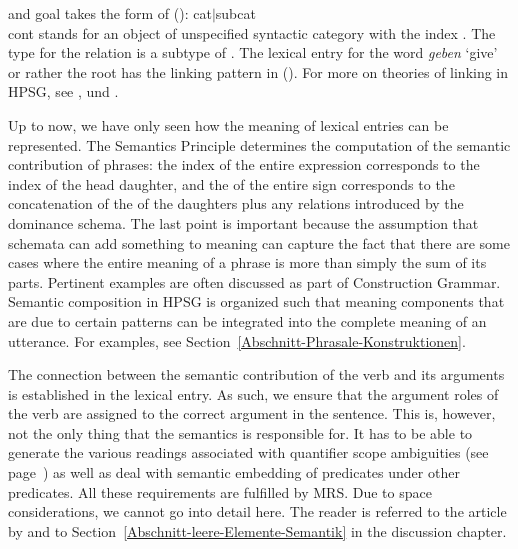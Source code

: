 and goal takes the form of ():
\ea
\label{ex-agens-theme-goal-linking}
\onems
{ cat$|$subcat  \\[1mm]
  cont  
}
\z
[] stands for an object of unspecified syntactic category with the index
. 
The type for the relation  is a subtype of .
The lexical entry for the word \emph{geben} `give' or rather the root  has the linking pattern in ().
%
For more on theories of linking in HPSG, see ,  und .

Up to now, we have only seen how the meaning of lexical entries can be represented. The Semantics Principle
determines the computation of the semantic contribution of phrases: the index of the entire expression corresponds to the index of
the head daughter, and the \relsv of the entire sign corresponds to the concatenation of the \relsvs of the daughters plus any relations
introduced by the dominance schema. The last point is important because the assumption that schemata can add something to meaning can capture
the fact that there are some cases where the entire meaning of a phrase is more than simply the sum of its parts.
Pertinent examples are often discussed as part of Construction Grammar\indexcxg. Semantic
composition in HPSG is organized such that meaning components that are due to certain patterns can be integrated into the complete meaning of an utterance. For examples, see Section~\ref{Abschnitt-Phrasale-Konstruktionen}.

The connection between the semantic contribution of the verb and its arguments is established in the lexical entry.
As such, we ensure that the argument roles of the verb are assigned to the correct argument in the sentence. This is, however, not the only
thing that the semantics is responsible for. It has to be able to generate the various readings associated with quantifier scope ambiguities 
(see page~\pageref{Beispiel-Every-man-loves-a-woman}) as well as deal with semantic embedding of predicates under other predicates. All these
requirements are fulfilled by MRS. Due to space considerations, we cannot go into detail here. The reader is referred to the article by
\citet*{CFPS2005a} and to Section~\ref{Abschnitt-leere-Elemente-Semantik} in the discussion chapter.



